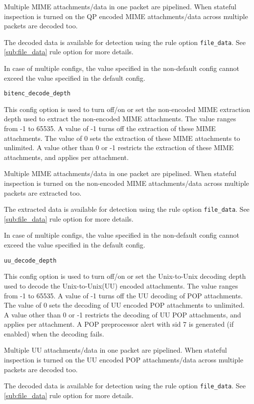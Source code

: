 \documentclass[english]{report}
\newcounter{slistnum}
\newenvironment{slist}
{ \begin{list}{ {\bf \arabic{slistnum}.} }{\usecounter{slistnum} } }
{ \end{list} }
\begin{document}
\begin{slist}
Multiple MIME attachments/data in one packet are pipelined. When stateful inspection
is turned on the QP encoded MIME attachments/data across multiple packets are decoded too.

The decoded data is available for detection using the rule option \texttt{file\_data}.
See \ref{sub:file_data} rule option for more details.

In case of multiple configs, the value specified in the non-default config cannot exceed
the value specified in the default config.

\item \texttt{bitenc\_decode\_depth}

This config option is used to turn off/on or set the non-encoded MIME extraction
depth used to extract the non-encoded MIME attachments. The value ranges from -1 
to 65535. A value of -1 turns off the extraction of these MIME attachments. 
The value of 0 sets the extraction of these MIME attachments to unlimited.
A value other than 0 or -1 restricts the extraction of these MIME attachments, and applies 
per attachment.

Multiple MIME attachments/data in one packet are pipelined. When stateful inspection
is turned on the non-encoded MIME attachments/data across multiple packets are extracted too.

The extracted data is available for detection using the rule option \texttt{file\_data}.
See \ref{sub:file_data} rule option for more details.

In case of multiple configs, the value specified in the non-default config cannot exceed
the value specified in the default config.

\item \texttt{uu\_decode\_depth}

This config option is used to turn off/on or set the Unix-to-Unix decoding depth
used to decode the Unix-to-Unix(UU) encoded attachments. The value ranges
from -1 to 65535. A value of -1 turns off the UU decoding of POP attachments.
The value of 0 sets the decoding of UU encoded POP attachments to unlimited. A
value other than 0 or -1 restricts the decoding of UU POP attachments, and applies per 
attachment. A POP preprocessor alert with sid 7 is generated (if enabled) when the decoding fails.

Multiple UU attachments/data in one packet are pipelined. When stateful inspection
is turned on the UU encoded POP attachments/data across multiple packets are decoded too.

The decoded data is available for detection using the rule option \texttt{file\_data}.
See \ref{sub:file_data} rule option for more details.


\end{slist}
\end{document}
